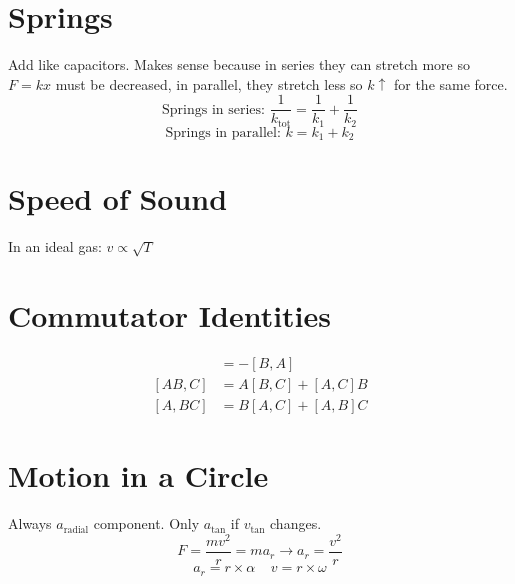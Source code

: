 \documentclass[10pt,a4paper]{article}
\begin{document}
\section{Springs} %
\label{sec:springs}
Add like capacitors. Makes sense because in series they can stretch more so $F=kx$ must be decreased, in parallel, they stretch less so $k \uparrow$ for the same force.\\
\begin{equation}
    \textrm{Springs in series: } \frac{1}{k_{\textrm{tot}}} = \frac{1}{k_1} + \frac{1}{k_2}
\end{equation}
\begin{equation}
    \textrm{Springs in parallel: } k = k_1 + k_2
\end{equation}

\section{Speed of Sound} %
\label{sec:speed_of_sound}
In an ideal gas: $v \propto \sqrt{T}$

\section{Commutator Identities} %
\label{sec:commutator_identities}
\begin{align}
[A,B]&=-[B,A]\\
[AB,C] &= A[B,C] + [A,C]B\\
[A,BC] &= B[A,C] + [A,B]C
\end{align}

\section{Motion in a Circle} %
\label{sec:motion_in_a_circle}
Always $a_{\textrm{radial}}$ component. Only $a_{\textrm{tan}}$ if $v_{\textrm{tan}}$ changes.
\begin{equation}
    F = \frac{mv^2}{r} = ma_r \rightarrow a_r = \frac{v^2}{r}
\end{equation}
\begin{equation}
    a_r = r \times \alpha~~~~~ v = r \times \omega
\end{equation}
\end{document}
